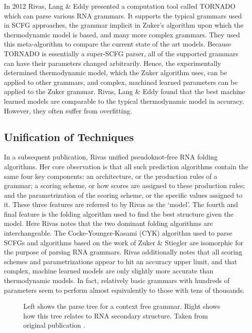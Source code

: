 \documentclass[12pt, a4paper]{article}
\begin{document}
In 2012 Rivas, Lang \& Eddy \cite{rivas2012range} presented a computation tool called TORNADO which can parse various RNA grammars. It supports the typical grammars used in SCFG approaches, the grammar implicit in Zuker's algorithm upon which the thermodynamic model is based, and many more complex grammars. They used this meta-algorithm to compare the current state of the art models. Because TORNADO is essentially a super-SCFG parser, all of the supported grammars can have their parameters changed arbitrarily. Hence, the experimentally determined thermodynamic model, which the Zuker algorithm uses, can be applied to other grammars, and complex, machined learned parameters can be applied to the Zuker grammar. Rivas, Lang \& Eddy found that the best machine learned models are comparable to the typical thermodynamic model in accuracy. However, they often suffer from overfitting.

\subsection{Unification of Techniques}

In a subsequent publication, Rivas \cite{rivas2013four} unified pseudoknot-free RNA folding algorithms. Her core observation is that all such prediction algorithms contain the same four key components: an architecture, or the production rules of a grammar; a scoring scheme, or how scores are assigned to these production rules; and the parametrization of the scoring scheme, or the specific values assigned to it. These three features are referred to by Rivas as the `model'. The fourth and final feature is the folding algorithm used to find the best structure given the model. Here Rivas notes that the two dominant folding algorithms are interchangeable. The Cocke-Younger-Kasami (CYK) algorithm used to parse SCFGs and algorithms based on the work of Zuker \& Stiegler are isomorphic for the purpose of parsing RNA grammars. Rivas additionally notes that all scoring schemes and parametrizations appear to hit an accuracy upper limit, and that complex, machine learned models are only slightly more accurate than thermodynamic models. In fact, relatively basic grammars with hundreds of parameters seem to perform almost equivalently to those with tens of thousands.

\begin{figure}
\begin{center}
\end{center}
\caption{Left shows the parse tree for a context free grammar. Right shows how this tree relates to RNA secondary structure. Taken from original publication \cite{sakakibara1994stochastic}.}
\label{fig:scfg}
\end{figure}
\end{document}
